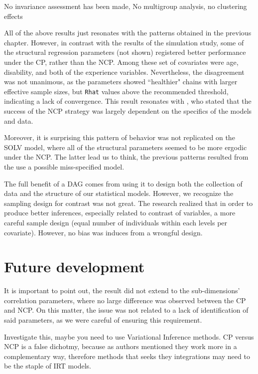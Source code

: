 No invariance assessment has been made, No multigroup analysis, no clustering effects

All of the above results just resonates with the patterns obtained in the previous chapter. However, in contrast with the results of the simulation study, some of the structural regression parameters (not shown) registered better performance under the CP, rather than the NCP. Among these set of covariates were age, disability, and both of the experience variables. Nevertheless, the disagreement was not unanimous, as the parameters showed ``healthier" chains with larger effective sample sizes, but \texttt{Rhat} values above the recommended threshold, indicating a lack of convergence. This result resonates with \citet{Papaspiliopoulos_et_al_2007}, who stated that the success of the NCP strategy was largely dependent on the specifics of the models and data.

Moreover, it is surprising this pattern of behavior was not replicated on the SOLV model, where all of the structural parameters seemed to be more ergodic under the NCP. The latter lead us to think, the previous patterns resulted from the use a possible miss-specified model.

The full benefit of a DAG comes from using it to design both the collection of data and the structure of our statistical models. However, we recognize the sampling design for contrast was not great. The research realized that in order to produce better inferences, especially related to contrast of variables, a more careful sample design (equal number of individuals within each levels per covariate). However, no bias was induces from a wrongful design.

\section{Future development}

It is important to point out, the result did not extend to the sub-dimensions' correlation parameters, where no large difference was observed between the CP and NCP. On this matter, the issue was not related to a lack of identification of said parameters, as we were careful of ensuring this requirement.

Investigate this, maybe you need to use Variational Inference methods. CP versus NCP is a false dichotmy, because as authors mentioned they work more in a complementary way, therefore methods that seeks they integrations may need to be the staple of IRT models.

